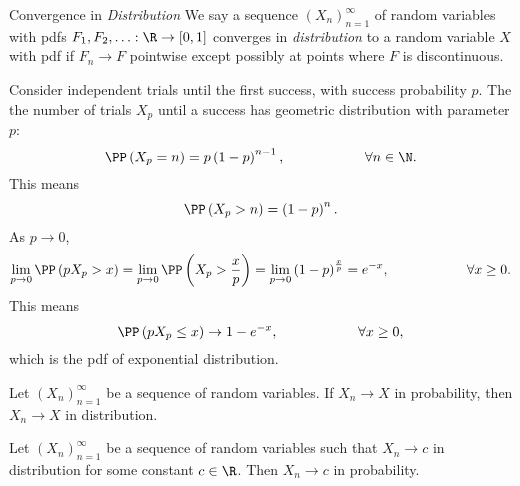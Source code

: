 \documentclass[stat901]{subfiles}
\begin{document}
    \begin{definition}{Convergence in \emph{Distribution}}
        We say a sequence $\left( X_{n} \right)^{\infty}_{n=1}$ of random variables with pdfs $F_1,F_2,\ldots:\R\to\left[ 0,1 \right]$ converges in \emph{distribution} to a random variable $X$ with pdf if $F_n\to F$ pointwise except possibly at points where $F$ is discontinuous.
    \end{definition}

    \begin{example}{}
        Consider independent trials until the first success, with success probability $p$. The the number of trials $X_p$ until a success has geometric distribution with parameter $p$:
        \begin{equation*}
            \PP\left( X_p=n \right) = p\left( 1-p \right)^{n-1}, \hspace{2cm}\forall n\in\N.
        \end{equation*}
        This means
        \begin{equation*}
            \PP\left( X_p>n \right) = \left( 1-p \right)^n.
        \end{equation*}
        As $p\to 0$,
        \begin{equation*}
            \lim_{p\to 0} \PP\left( pX_p>x \right) = \lim_{p\to 0}\PP\left( X_p > \frac{x}{p} \right) = \lim_{p\to 0} \left( 1-p \right)^{\frac{x}{p}} = e^{-x},\hspace{2cm}\forall x\geq 0.
        \end{equation*}
        This means
        \begin{equation*}
            \PP\left( pX_p \leq x \right) \to 1-e^{-x},\hspace{2cm}\forall x\geq 0,
        \end{equation*}
        which is the pdf of exponential distribution.
    \end{example}
    
    \rruleline

    \begin{prop}{}
        Let $\left( X_{n} \right)^{\infty}_{n=1}$ be a sequence of random variables. If $X_n\to X$ in probability, then $X_n\to X$ in distribution.
    \end{prop}

    \rruleline

    \begin{prop}{}
        Let $\left( X_{n} \right)^{\infty}_{n=1}$ be a sequence of random variables such that $X_n\to c$ in distribution for some constant $c\in\R$. Then $X_n\to c$ in probability.
    \end{prop}
\end{document}
